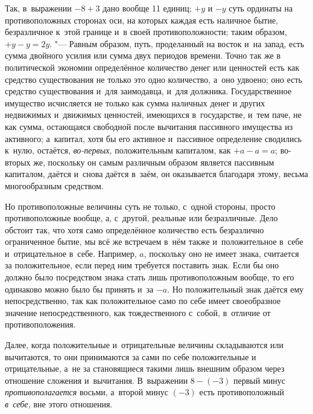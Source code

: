 Так, в~выражении $-8+3$ дано вообще 11 единиц; $+y$ и $-y$ суть
ординаты на противоположных сторонах оси, на которых каждая есть наличное
бытие, безразличное к~этой границе и~в своей противоположности; таким
образом, $+y-y=2y$. "--- Равным образом, путь,
проделанный на восток и~на запад, есть
сумма двойного усилия или сумма двух периодов времени. Точно так же в
политической экономии определённое количество денег или ценностей есть как
средство существования не только это одно количество, а~оно удвоено; оно
есть средство существования и~для заимодавца, и~для должника.
Государственное имущество исчисляется не только как сумма наличных денег и
других недвижимых и~движимых ценностей, имеющихся в~государстве, и~тем
паче, не как сумма, остающаяся свободной после вычитания пассивного
имущества из активного; а~капитал, хотя бы его активное и~пассивное
определение сводились к~нулю, остаётся,
{\em во-первых,} положительным капиталом, как $+a-a=a$;
во-вторых же, поскольку он самым различным образом является пассивным
капиталом, даётся и~снова даётся в~заём, он оказывается благодаря этому,
весьма многообразным средством.

Но противоположные величины суть не только, с~одной стороны, просто
противоположные вообще, а, с~другой, реальные или безразличные. Дело
обстоит так, что хотя само определённое количество есть безразлично
ограниченное бытие, мы всё же встречаем в~нём также и~положительное в~себе
и~отрицательное в~себе. Например, $a$, поскольку
оно не имеет знака, считается за положительное, если перед ним требуется
поставить знак. Если бы оно должно было посредством знака стать лишь
противоположным вообще, то его одинаково можно было бы принять и~за
$-a$. Но положительный знак даётся ему
непосредственно, так как положительное само по себе имеет своеобразное
значение непосредственного, как тождественного с~собой, в~отличие от
противоположения.

Далее, когда положительные и~отрицательные величины складываются или
вычитаются, то они принимаются за сами по себе положительные и
отрицательные, а~не за становящиеся такими лишь внешним образом через
отношение сложения и~вычитания. В~выражении $8-(-3)$ первый минус
{\em противополагается} восьми, а~второй минус $(-3)$
есть противоположный {\em в~себе,} вне этого отношения.

